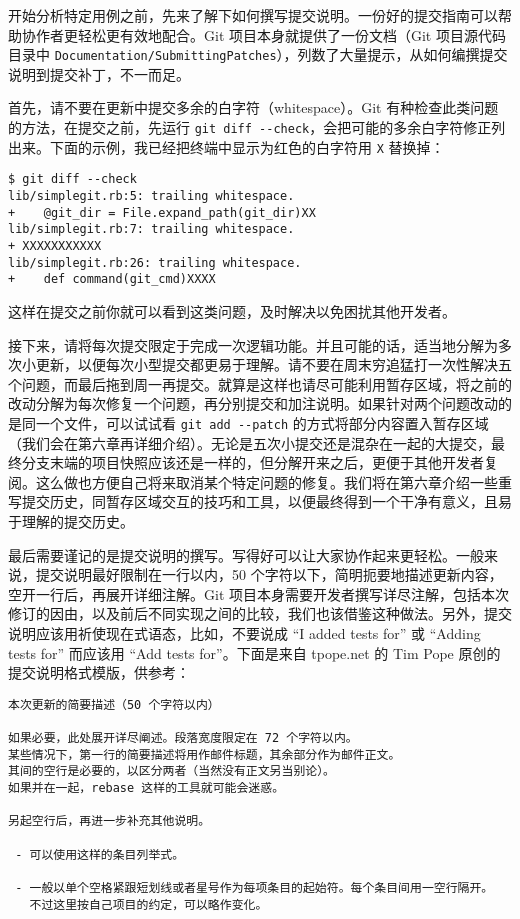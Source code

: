 \documentclass[a4paper]{book}
\begin{document}
开始分析特定用例之前，先来了解下如何撰写提交说明。一份好的提交指南可以帮助协作者更轻松更有效地配合。Git 项目本身就提供了一份文档（Git 项目源代码目录中 \texttt{Documentation/SubmittingPatches}），列数了大量提示，从如何编撰提交说明到提交补丁，不一而足。

首先，请不要在更新中提交多余的白字符（whitespace）。Git 有种检查此类问题的方法，在提交之前，先运行 \texttt{git diff -{}-check}，会把可能的多余白字符修正列出来。下面的示例，我已经把终端中显示为红色的白字符用 \texttt{X} 替换掉：

\begin{shaded}\begin{verbatim}
$ git diff --check
lib/simplegit.rb:5: trailing whitespace.
+    @git_dir = File.expand_path(git_dir)XX
lib/simplegit.rb:7: trailing whitespace.
+ XXXXXXXXXXX
lib/simplegit.rb:26: trailing whitespace.
+    def command(git_cmd)XXXX
\end{verbatim}\end{shaded}

这样在提交之前你就可以看到这类问题，及时解决以免困扰其他开发者。

接下来，请将每次提交限定于完成一次逻辑功能。并且可能的话，适当地分解为多次小更新，以便每次小型提交都更易于理解。请不要在周末穷追猛打一次性解决五个问题，而最后拖到周一再提交。就算是这样也请尽可能利用暂存区域，将之前的改动分解为每次修复一个问题，再分别提交和加注说明。如果针对两个问题改动的是同一个文件，可以试试看 \texttt{git add -{}-patch} 的方式将部分内容置入暂存区域（我们会在第六章再详细介绍）。无论是五次小提交还是混杂在一起的大提交，最终分支末端的项目快照应该还是一样的，但分解开来之后，更便于其他开发者复阅。这么做也方便自己将来取消某个特定问题的修复。我们将在第六章介绍一些重写提交历史，同暂存区域交互的技巧和工具，以便最终得到一个干净有意义，且易于理解的提交历史。

最后需要谨记的是提交说明的撰写。写得好可以让大家协作起来更轻松。一般来说，提交说明最好限制在一行以内，50 个字符以下，简明扼要地描述更新内容，空开一行后，再展开详细注解。Git 项目本身需要开发者撰写详尽注解，包括本次修订的因由，以及前后不同实现之间的比较，我们也该借鉴这种做法。另外，提交说明应该用祈使现在式语态，比如，不要说成 “I added tests for” 或 “Adding tests for” 而应该用 “Add tests for”。下面是来自 tpope.net 的 Tim Pope 原创的提交说明格式模版，供参考：

\begin{shaded}\begin{verbatim}
本次更新的简要描述（50 个字符以内）

如果必要，此处展开详尽阐述。段落宽度限定在 72 个字符以内。
某些情况下，第一行的简要描述将用作邮件标题，其余部分作为邮件正文。
其间的空行是必要的，以区分两者（当然没有正文另当别论）。
如果并在一起，rebase 这样的工具就可能会迷惑。

另起空行后，再进一步补充其他说明。

 - 可以使用这样的条目列举式。

 - 一般以单个空格紧跟短划线或者星号作为每项条目的起始符。每个条目间用一空行隔开。
   不过这里按自己项目的约定，可以略作变化。
\end{verbatim}\end{shaded}
\end{document}
